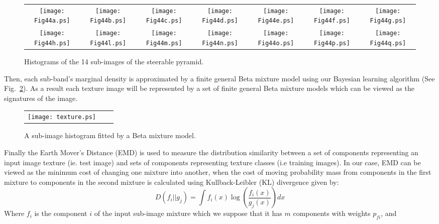 \documentclass[journal,10pt]{elsart}
\begin{document}
\begin{figure}[!h]
\begin{tabular}{ccccccc}
\texttt{[image: Fig44a.ps]}&
\texttt{[image: Fig44b.ps]}&
\texttt{[image: Fig44c.ps]}&
\texttt{[image: Fig44d.ps]}&
\texttt{[image: Fig44e.ps]}&
\texttt{[image: Fig44f.ps]}&
\texttt{[image: Fig44g.ps]}\\
\texttt{[image: Fig44h.ps]}&
\texttt{[image: Fig44l.ps]}&
\texttt{[image: Fig44m.ps]}&
\texttt{[image: Fig44n.ps]}&
\texttt{[image: Fig44o.ps]}&
\texttt{[image: Fig44p.ps]}&
\texttt{[image: Fig44q.ps]}
\end{tabular}
\caption{Histograms of the 14 sub-images of the steerable pyramid.}
\label{fig:48}
\end{figure}
Then, each sub-band's marginal density is approximated by a finite general Beta mixture model using our Bayesian learning algorithm (See Fig.~\ref{fig:49}). As
a result each texture image will be represented by a set of finite general Beta mixture models which can be viewed as the signatures of the image.
\begin{figure}[!h]
\begin{center}
\begin{tabular}{ccc}
\texttt{[image: texture.ps]}
\end{tabular}
\caption{A sub-image histogram fitted by a Beta mixture model.} \label{fig:49}
\end{center}
\end{figure}
Finally the Earth Mover's Distance (EMD) \cite{Rubner2000} is used to measure the distribution similarity between a set of components
representing an input image texture (ie. test image) and sets of components
representing texture classes (i.e training images). In our case, EMD can be viewed as the minimum cost of
changing one mixture into another, when the cost of moving
probability mass from components in the first mixture to
components in the second mixture is calculated using Kullback-Leibler (KL) divergence given by:
\begin{equation}
D(f_i||g_j)=\int f_i(x) \log(\frac{f_i(x)}{g_j(x)})dx
\end{equation}
Where $f_i$ is the component $i$ of the input sub-image mixture which we suppose that it has $m$ components with weights $p_{fi}$, and
\end{document}
